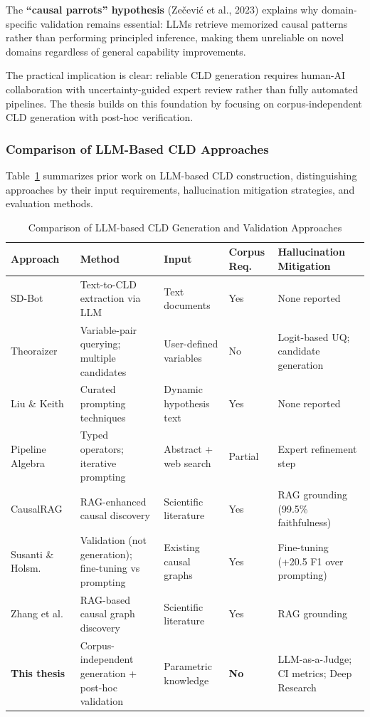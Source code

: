 The \textbf{``causal parrots'' hypothesis} (Zečević et al., 2023) explains why domain-specific validation remains essential: LLMs retrieve memorized causal patterns rather than performing principled inference, making them unreliable on novel domains regardless of general capability improvements.

The practical implication is clear: reliable CLD generation requires human-AI collaboration with uncertainty-guided expert review rather than fully automated pipelines. The thesis builds on this foundation by focusing on corpus-independent CLD generation with post-hoc verification.

\subsubsection{Comparison of LLM-Based CLD Approaches}

Table~\ref{tab:prior_cld_work} summarizes prior work on LLM-based CLD construction, distinguishing approaches by their input requirements, hallucination mitigation strategies, and evaluation methods.

\begin{table}[h]
\centering
\caption{Comparison of LLM-based CLD Generation and Validation Approaches}
\label{tab:prior_cld_work}
\footnotesize
\begin{tabular}{p{2.0cm}p{2.4cm}p{1.8cm}p{1.5cm}p{3.0cm}}
\toprule
\textbf{Approach} & \textbf{Method} & \textbf{Input} & \textbf{Corpus Req.} & \textbf{Hallucination Mitigation} \\
\midrule
SD-Bot~\citep{hosseinichimeh2024textmapdynamicsbot} & Text-to-CLD extraction via LLM & Text documents & Yes & None reported \\
\midrule
Theoraizer~\citep{Waaijers2024theoraizer} & Variable-pair querying; multiple candidates & User-defined variables & No & Logit-based UQ; candidate generation \\
\midrule
Liu \& Keith~\citep{liu2025leveraging} & Curated prompting techniques & Dynamic hypothesis text & Yes & None reported \\
\midrule
Pipeline Algebra~\citep{systems13090784} & Typed operators; iterative prompting & Abstract + web search & Partial & Expert refinement step \\
\midrule
CausalRAG~\citep{wang2025causalrag} & RAG-enhanced causal discovery & Scientific literature & Yes & RAG grounding (99.5\% faithfulness) \\
\midrule
Susanti \& Holsm.~\citep{susanti2025prompting} & Validation (not generation); fine-tuning vs prompting & Existing causal graphs & Yes & Fine-tuning (+20.5 F1 over prompting) \\
\midrule
Zhang et al.~\citep{zhang2024causal} & RAG-based causal graph discovery & Scientific literature & Yes & RAG grounding \\
\midrule
\textbf{This thesis} & Corpus-independent generation + post-hoc validation & Parametric knowledge & \textbf{No} & LLM-as-a-Judge; CI metrics; Deep Research \\
\bottomrule
\end{tabular}
\end{table}

